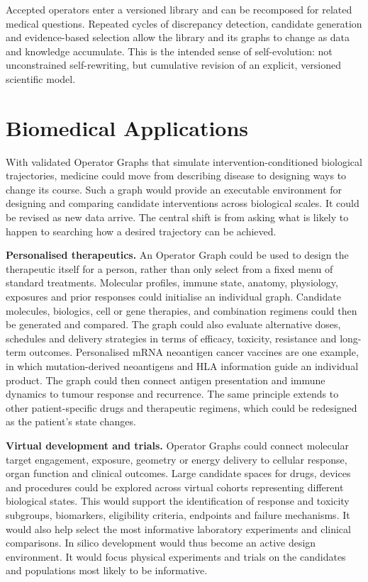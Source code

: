 \documentclass[12pt, letterpaper]{article} %
\begin{document}
Accepted operators enter a versioned library and can be recomposed for related medical questions. Repeated cycles of discrepancy detection, candidate generation and evidence-based selection allow the library and its graphs to change as data and knowledge accumulate. This is the intended sense of self-evolution: not unconstrained self-rewriting, but cumulative revision of an explicit, versioned scientific model. 

\section{Biomedical Applications}

With validated Operator Graphs that simulate intervention-conditioned biological trajectories, medicine could move from describing disease to designing ways to change its course. Such a graph would provide an executable environment for designing and comparing candidate interventions across biological scales. It could be revised as new data arrive. The central shift is from asking what is likely to happen to searching how a desired trajectory can be achieved.

\textbf{Personalised therapeutics.} An Operator Graph could be used to design the therapeutic itself for a person, rather than only select from a fixed menu of standard treatments. Molecular profiles, immune state, anatomy, physiology, exposures and prior responses could initialise an individual graph. Candidate molecules, biologics, cell or gene therapies, and combination regimens could then be generated and compared. The graph could also evaluate alternative doses, schedules and delivery strategies in terms of efficacy, toxicity, resistance and long-term outcomes. Personalised mRNA neoantigen cancer vaccines are one example, in which mutation-derived neoantigens and HLA information guide an individual product\cite{Rojas2023RNAVaccine,Sethna2025RNAVaccine}. The graph could then connect antigen presentation and immune dynamics to tumour response and recurrence. The same principle extends to other patient-specific drugs and therapeutic regimens, which could be redesigned as the patient's state changes.

\textbf{Virtual development and trials.} Operator Graphs could connect molecular target engagement, exposure, geometry or energy delivery to cellular response, organ function and clinical outcomes. Large candidate spaces for drugs, devices and procedures could be explored across virtual cohorts representing different biological states. This would support the identification of response and toxicity subgroups, biomarkers, eligibility criteria, endpoints and failure mechanisms. It would also help select the most informative laboratory experiments and clinical comparisons. In silico development would thus become an active design environment. It would focus physical experiments and trials on the candidates and populations most likely to be informative\cite{Viceconti2021InSilico}.
\end{document}
